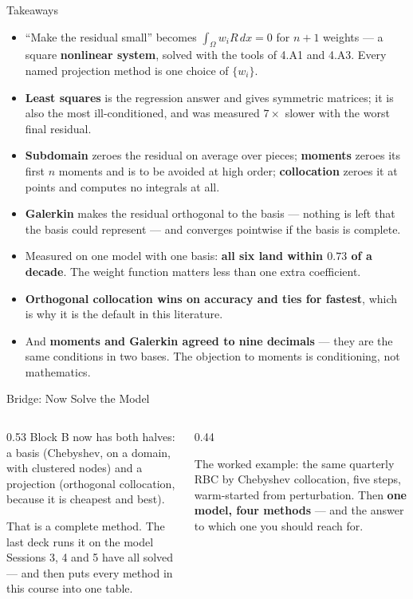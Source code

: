 \begin{frame}{Takeaways}
\begin{takeawaybox}
\begin{itemize}\small
  \item ``Make the residual small'' becomes $\int_\Omega w_i R\,dx=0$ for $n+1$ weights --- a square \textbf{nonlinear system}, solved with the tools of 4.A1 and 4.A3. Every named projection method is one choice of $\{w_i\}$.
  \item \textbf{Least squares} is the regression answer and gives symmetric matrices; it is also the most ill-conditioned, and was measured $7\times$ slower with the worst final residual.
  \item \textbf{Subdomain} zeroes the residual on average over pieces; \textbf{moments} zeroes its first $n$ moments and is to be avoided at high order; \textbf{collocation} zeroes it at points and computes no integrals at all.
  \item \textbf{Galerkin} makes the residual orthogonal to the basis --- nothing is left that the basis could represent --- and converges pointwise if the basis is complete.
  \item Measured on one model with one basis: \textbf{all six land within $0.73$ of a decade}. The weight function matters less than one extra coefficient.
  \item \textbf{Orthogonal collocation wins on accuracy and ties for fastest}, which is why it is the default in this literature.
  \item And \textbf{moments and Galerkin agreed to nine decimals} --- they are the same conditions in two bases. The objection to moments is conditioning, not mathematics.
\end{itemize}
\end{takeawaybox}
\end{frame}

\begin{frame}{Bridge: Now Solve the Model}
\begin{columns}[T]
\begin{column}{0.53\textwidth}
\small
Block B now has both halves: a basis (Chebyshev, on a domain, with clustered nodes) and a projection (orthogonal collocation, because it is cheapest and best).
\medskip

That is a complete method. The last deck runs it on the model Sessions 3, 4 and 5 have all solved --- and then puts every method in this course into one table.
\end{column}
\begin{column}{0.44\textwidth}
\begin{conceptbox}[title=\textbf{Next (5.B6)}]\small
The worked example: the same quarterly RBC by Chebyshev collocation, five steps, warm-started from perturbation. Then \textbf{one model, four methods} --- and the answer to which one you should reach for.
\end{conceptbox}
\end{column}
\end{columns}
\end{frame}


